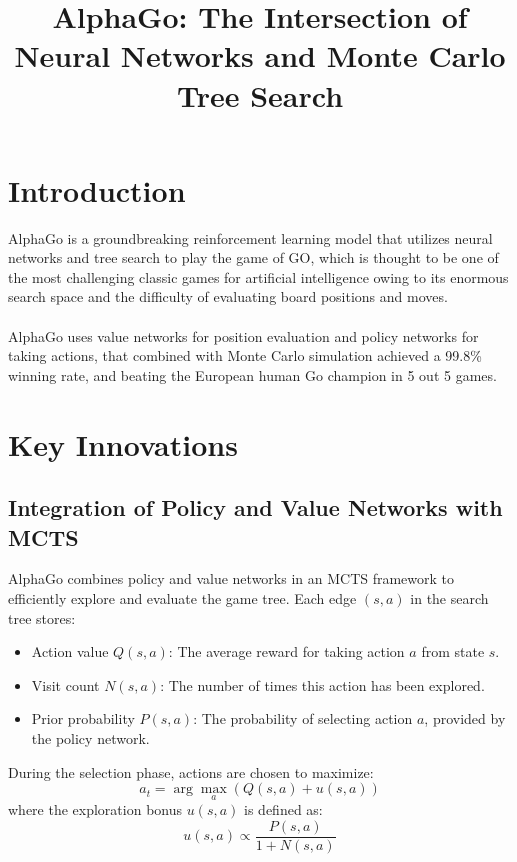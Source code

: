 \documentclass[conference]{IEEEtran}
\begin{document}
\title{AlphaGo: The Intersection of Neural Networks and Monte Carlo Tree Search\\
}

\maketitle


\section{Introduction}
AlphaGo is a groundbreaking reinforcement learning model that utilizes neural networks and tree search to play the game of GO, which is thought to be one of the most challenging classic games for artificial intelligence owing to its enormous search space and the difficulty of evaluating board positions and moves.
\\\\
AlphaGo uses value networks for position evaluation and policy networks for taking actions, that combined with Monte Carlo simulation achieved a 99.8\% winning rate, and beating the European human Go champion in 5 out 5 games.
\section{Key Innovations}

\subsection{Integration of Policy and Value Networks with MCTS}
AlphaGo combines policy and value networks in an MCTS framework to efficiently explore and evaluate the game tree. Each edge \( (s, a) \) in the search tree stores:
\begin{itemize}
    \item Action value \( Q(s, a) \): The average reward for taking action \( a \) from state \( s \).
    \item Visit count \( N(s, a) \): The number of times this action has been explored.
    \item Prior probability \( P(s, a) \): The probability of selecting action \( a \), provided by the policy network.
\end{itemize}

During the selection phase, actions are chosen to maximize:
\[
a_t = \arg\max_a \left( Q(s, a) + u(s, a) \right)
\]
where the exploration bonus \( u(s, a) \) is defined as:
\[
u(s, a) \propto \frac{P(s, a)}{1 + N(s, a)}
\]
\end{document}
